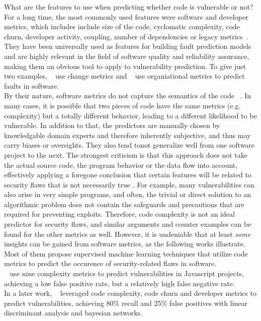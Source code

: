 \documentclass[
	a4paper,
	pagesize,
	pdftex,
	12pt,
	twoside, %
	BCOR=5mm, %
	ngerman,
	fleqn,
	final,
	]{scrartcl}
\begin{document}
What are the features to use when predicting whether code is vulnerable or not? For a long time, the most commonly used features were software and developer metrics, which includes include size of the code, cyclomatic complexity, code churn, developer activity, coupling, number of dependencies or legacy metrics~\cite{Morrison.2015}. They have been universally used as features for building fault prediction models~\cite{Hall.2011} and are highly relevant in the field of software quality and reliability assurance, making them an obvious tool to apply to vulnerability prediction. To give just two examples, ~\cite{ACM.2008b} use change metrics and ~\cite{Nagappan.2008} use organiational metrics to predict faults in software. \\
By their nature, software metrics do not capture the semantics of the code ~\cite{Shin.2008}. In many cases, it is possible that two pieces of code have the same metrics (e.g. complexity) but a totally different behavior, leading to a different likelihood to be vulnerable. In addition to that, the predictors are manually chosen by knowledgable domain experts and therefore inherently subjective, and thus may carry biases or oversights\cite{Dam.2017}. They also tend tonot generalize well from one software project to the next. The strongest criticism is that this approach does not take the actual source code, the program behavior or the data flow into account, effectively applying a foregone conclusion that certain features will be related to security flaws that is not necessarily true \citep{Hovsepyan.2012}. For example, many vulnerabilities can also arise in very simple programs, and often, the trivial or direct solution to an algorithmic problem does not contain the safeguards and precautions that are required for preventing exploits. Therefore, code complexity is not an ideal predictor for security flaws, and similar arguments and counter examples can be found for the other metrics as well. However, it is undeniable that at least \textit{some} insights can be gained from software metrics, as the following works illustrate. Most of them propose supervised machine learning techniques that utilize code metrics to predict the occurence of security-related flaws in software.\\

~\cite{Shin.2008} use nine complexity metrics to predict vulnerabilities in Javascript projects, achieving a low false positive rate, but a relatively high false negative rate.\\
In a later work, ~\cite{Shin.2010} leveraged code complexity, code churn and developer metrics to predict vulnerabilities, achieving 80\% recall and 25\% false positives with linear discriminant analysis and bayesian networks. 
\end{document}
